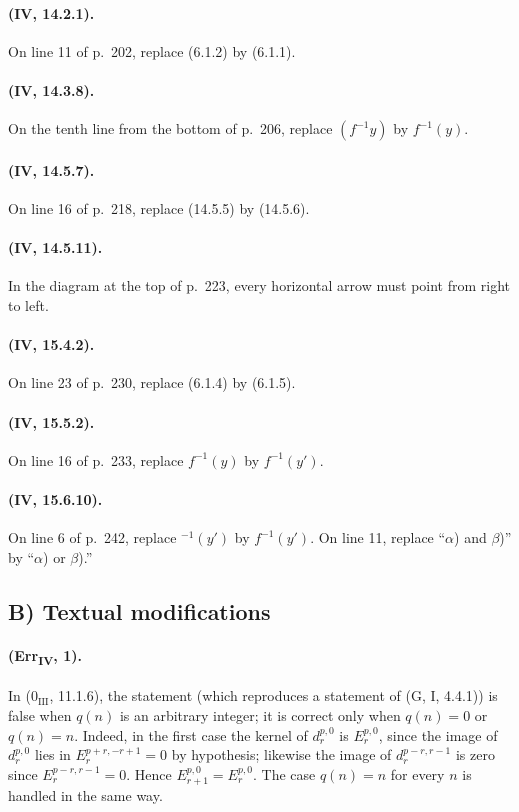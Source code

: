 \paragraph{(IV, 14.2.1).}
On line 11 of p.~202, replace (6.1.2) by (6.1.1).

\paragraph{(IV, 14.3.8).}
On the tenth line from the bottom of p.~206, replace $(f^{-1}y)$ by
$f^{-1}(y)$.

\paragraph{(IV, 14.5.7).}
On line 16 of p.~218, replace (14.5.5) by (14.5.6).

\paragraph{(IV, 14.5.11).}
In the diagram at the top of p.~223, every horizontal arrow must point
from right to left.

\paragraph{(IV, 15.4.2).}
On line 23 of p.~230, replace (6.1.4) by (6.1.5).

\paragraph{(IV, 15.5.2).}
On line 16 of p.~233, replace $f^{-1}(y)$ by $f^{-1}(y')$.

\paragraph{(IV, 15.6.10).}
On line 6 of p.~242, replace ${}^{-1}(y')$ by $f^{-1}(y')$.  On line
11, replace ``$\alpha$) and $\beta$)'' by ``$\alpha$) or $\beta$).''

\subsection*{B) Textual modifications}

\paragraph{(Err\textsubscript{IV}, 1).}
In ($0_{\mathrm{III}}$, 11.1.6), the statement (which reproduces a
statement of (G, I, 4.4.1)) is false when $q(n)$ is an arbitrary integer;
it is correct only when $q(n)=0$ or $q(n)=n$.  Indeed, in the first case
the kernel of $d_r^{p,0}$ is $E_r^{p,0}$, since the image of
$d_r^{p,0}$ lies in $E_r^{p+r,-r+1}=0$ by hypothesis; likewise the
image of $d_r^{p-r,r-1}$ is zero since $E_r^{p-r,r-1}=0$.  Hence
$E_{r+1}^{p,0}=E_r^{p,0}$.  The case $q(n)=n$ for every $n$ is handled
in the same way.

